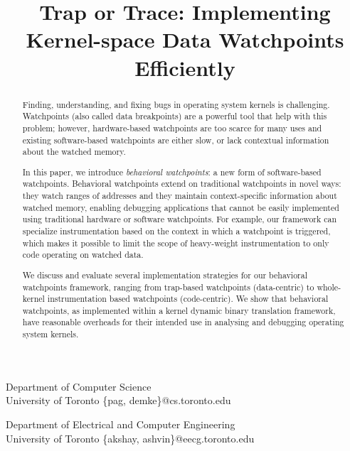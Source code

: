 \documentclass[11pt,preprint,onecolumn,nocopyrightspace]{sigplanconf}
\begin{document}
\titlebanner{}        %
\preprintfooter{}   %

\title{Trap or Trace: Implementing Kernel-space Data Watchpoints Efficiently}
\subtitle{}

           {Department of Computer Science\\ University of Toronto}
           {\{pag, demke\}@cs.toronto.edu}

           {Department of Electrical and Computer Engineering\\ University of Toronto}
           {\{akshay, ashvin\}@eecg.toronto.edu}

\maketitle

\begin{abstract}

Finding, understanding, and fixing bugs in operating system kernels is challenging. Watchpoints (also called data breakpoints) are a powerful tool that help with this problem; however, hardware-based watchpoints are too scarce for many uses and existing software-based watchpoints are either slow, or lack contextual information about the watched memory.

In this paper, we introduce \emph{behavioral watchpoints}: a new form of software-based watchpoints. Behavioral watchpoints extend on traditional watchpoints in novel ways: they watch ranges of addresses and they maintain context-specific information about watched memory, enabling debugging applications that cannot be easily implemented using traditional hardware or software watchpoints. For example, our framework can specialize instrumentation based on the context in which a watchpoint is triggered, which makes it possible to limit the scope of heavy-weight instrumentation to only code operating on watched data.

We discuss and evaluate several implementation strategies for our behavioral watchpoints framework, ranging from trap-based watchpoints (data-centric) to whole-kernel instrumentation based watchpoints (code-centric). We show that behavioral watchpoints, as implemented within a kernel dynamic binary translation framework, have reasonable overheads for their intended use in analysing and debugging operating system kernels.
\end{abstract}
\end{document}

